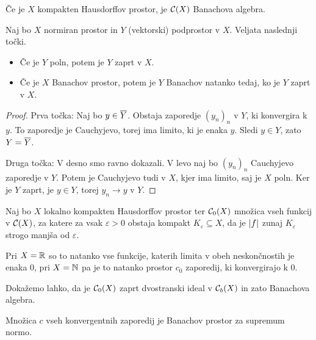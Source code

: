 \begin{posledica}
  Če je $X$ kompakten Hausdorffov prostor, je $\mathcal{C}(X)$ Banachova algebra.
\end{posledica}

\begin{trditev}
  Naj bo $X$ normiran prostor in $Y$ (vektorski) podprostor v $X$.
  Veljata naslednji točki.
  \begin{itemize}
  \item Če je $Y$ poln, potem je $Y$ zaprt v $X$.
  \item Če je $X$ Banachov prostor, potem je $Y$ Banachov natanko tedaj, ko je
	$Y$ zaprt v $X$.
  \end{itemize}
\end{trditev}

\begin{proof}
  Prva točka:
  Naj bo $y \in \overline{Y}$.
  Obstaja zaporedje $(y_n)_n$ v $Y$, ki konvergira k $y$.
  To zaporedje je Cauchyjevo, torej ima limito, ki je enaka $y$.
  Sledi $y \in Y$, zato $Y = \overline{Y}$.

  Druga točka:
  V desno smo ravno dokazali.
  V levo naj bo $(y_n)_n$ Cauchyjevo zaporedje v $Y$.
  Potem je Cauchyjevo tudi v $X$, kjer ima limito, saj je $X$ poln.
  Ker je $Y$ zaprt, je $y \in Y$, torej $y_n \to y$ v $Y$.
\end{proof}

\begin{primer}
  Naj bo $X$ lokalno kompakten Hausdorffov prostor ter $\mathcal{C}_0(X)$ množica
  vseh funkcij v $\mathcal{C}(X)$, za katere za vsak $\varepsilon > 0$ obstaja
  kompakt $K_\varepsilon \subseteq X$, da je $\left| f \right|$ zunaj $K_\varepsilon$
  strogo manjša od $\varepsilon$.

  Pri $X = \mathbb{R}$ so to natanko vse funkcije, katerih limita v obeh neskončnostih
  je enaka $0$, pri $X = \mathbb{N}$ pa je to natanko prostor $c_0$ zaporedij, ki
  konvergirajo k $0$.

  Dokažemo lahko, da je $\mathcal{C}_0(X)$ zaprt dvostranski ideal v
  $\mathcal{C}_b(X)$ in zato Banachova algebra.
\end{primer}

\begin{primer}
  Množica $c$ vseh konvergentnih zaporedij je Banachov prostor za supremum
  normo.
\end{primer}


